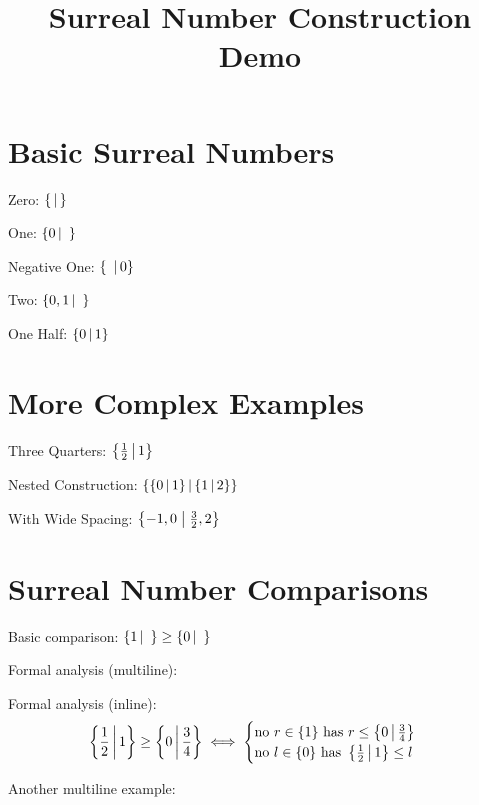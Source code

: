 \documentclass{article}
\begin{document}
\title{Surreal Number Construction Demo}
\maketitle

\section{Basic Surreal Numbers}

\noindent Zero: $\surrealzero$

\noindent One: $\surreal{0}{\ }$

\noindent Negative One: $\surreal{\ }{0}$

\noindent Two: $\surreal{0,1}{\ }$

\noindent One Half: $\surreal{0}{1}$

\section{More Complex Examples}

\noindent Three Quarters: $\surreal{\frac{1}{2}}{1}$

\noindent Nested Construction: $\surreal{\surreal{0}{1}}{\surreal{1}{2}}$

\noindent With Wide Spacing: $\surrealwide{-1, 0}{\frac{3}{2}, 2}$

\section{Surreal Number Comparisons}

\noindent Basic comparison: $\surrealgeqsimple{1}{\  }{0}{\  }$

\noindent Formal analysis (multiline):

\noindent Formal analysis (inline):
$$\surrealgeqinline{\frac{1}{2}}{1}{0}{\frac{3}{4}}$$

\noindent Another multiline example:
\end{document}
